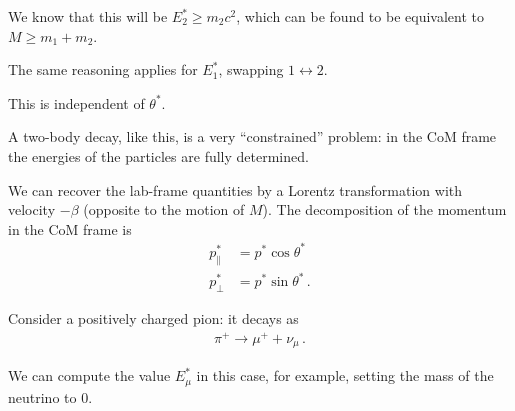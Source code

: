 \documentclass[main.tex]{subfiles}
\begin{document}
We know that this will be \(E^{*}_{2} \geq m_2c^2\), which can be found to be equivalent to \(M \geq m_1 + m_2 \). 

The same reasoning applies for \(E^{*}_{1}\), swapping \(1 \leftrightarrow 2\). 

This is independent of \(\theta^{*}\). 

A two-body decay, like this, is a very ``constrained'' problem: in the CoM frame the energies of the particles are fully determined. 

We can recover the lab-frame quantities by a Lorentz transformation with velocity \(-\beta \) (opposite to the motion of \(M\)). 
The decomposition of the momentum in the CoM frame is 
%
\begin{align}
p^{*}_{\parallel} &= p^{*} \cos \theta^{*} \\
p^{*}_{\perp} &= p^{*} \sin \theta^{*}
\,.
\end{align}

Consider a positively charged pion: it decays as 
%
\begin{align}
\pi^{+} \to \mu^{+} + \nu_{\mu}
\,.
\end{align}

We can compute the value \(E^{*}_{\mu }\) in this case, for example, setting the mass of the neutrino to 0. 
\end{document}
